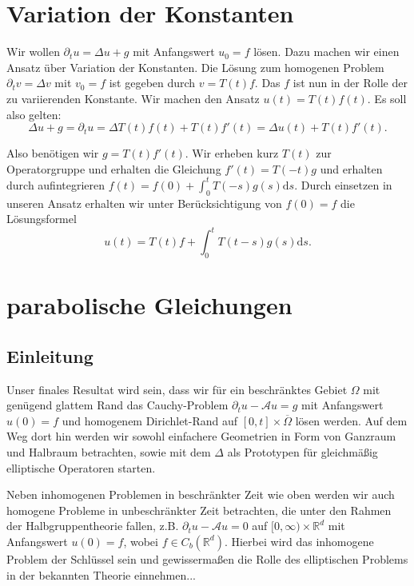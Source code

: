 \documentclass[11pt,a4paper]{scrartcl}
\newcommand{\R}{\mathbb{R}} %
\newcommand{\A}{\mathcal{A}}
\theoremstyle{plain}
\theoremstyle{definition}
\theoremstyle{remark}
\begin{document}


\section{Variation der Konstanten}

Wir wollen $\partial_t u = \Delta u + g$ mit Anfangswert $u_0=f$ lösen. Dazu machen wir einen Ansatz über Variation der Konstanten. Die Lösung zum homogenen Problem $\partial_t v = \Delta v$ mit $v_0=f$ ist gegeben durch $v=T(t)f$. Das $f$ ist nun in der Rolle der zu variierenden Konstante. Wir machen den Ansatz $u(t)=T(t)f(t)$. Es soll also gelten: $$\Delta u + g = \partial_t u = \Delta T(t)f(t) + T(t)f'(t) = \Delta u(t) + T(t)f'(t).$$

Also benötigen wir $g = T(t)f'(t)$. Wir erheben kurz $T(t)$ zur Operatorgruppe und erhalten die Gleichung $f'(t)=T(-t)g$ und erhalten durch aufintegrieren $f(t)=f(0)+\int_0^t T(-s)g(s) \mathrm{d}s$. Durch einsetzen in unseren Ansatz erhalten wir unter Berücksichtigung von $f(0)=f$ die Lösungsformel $$u(t)=T(t)f+\int_0^t T(t-s)g(s) \mathrm{d}s.$$

\section{parabolische Gleichungen}

\subsection{Einleitung}

Unser finales Resultat wird sein, dass wir für ein beschränktes Gebiet $\Omega$ mit genügend glattem Rand das Cauchy-Problem $\partial_t u - \A u = g$ mit Anfangswert $u(0)=f$ und homogenem Dirichlet-Rand auf $[0,t]\times \overline{\Omega}$ lösen werden. Auf dem Weg dort hin werden wir sowohl einfachere Geometrien in Form von Ganzraum und Halbraum betrachten, sowie mit dem $\Delta$ als Prototypen für gleichmäßig elliptische Operatoren starten.

Neben inhomogenen Problemen in beschränkter Zeit wie oben werden wir auch homogene Probleme in unbeschränkter Zeit betrachten, die unter den Rahmen der Halbgruppentheorie fallen, z.B. $\partial_t u - \A  u = 0$ auf $[0,\infty)\times \R^d$ mit Anfangswert $u(0)=f$, wobei $f\in C_b(\R^d)$. Hierbei wird das inhomogene Problem der Schlüssel sein und gewissermaßen die Rolle des elliptischen Problems in der bekannten Theorie einnehmen...
\end{document}
